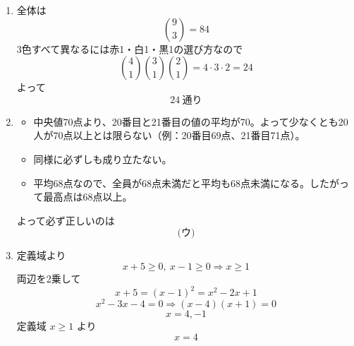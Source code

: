 \documentclass[lualatex,ja=standard]{bxjsarticle}
\begin{document}
\begin{enumerate}
\item 全体は
\[
\binom93=84
\]
3色すべて異なるには赤1・白1・黒1の選び方なので
\[
\binom41\binom31\binom21=4\cdot3\cdot2=24
\]
よって
\[
24\ \text{通り}
\]

\item
\begin{itemize}
\item[(ア)] 中央値70点より、20番目と21番目の値の平均が70。よって少なくとも20人が70点以上とは限らない（例：20番目69点、21番目71点）。
\item[(イ)] 同様に必ずしも成り立たない。
\item[(ウ)] 平均68点なので、全員が68点未満だと平均も68点未満になる。したがって最高点は68点以上。
\end{itemize}
よって必ず正しいのは
\[
\text{(ウ)}
\]

\item 定義域より
\[
x+5\ge0,\ x-1\ge0 \Rightarrow x\ge1
\]
両辺を2乗して
\[
x+5=(x-1)^2=x^2-2x+1
\]
\[
x^2-3x-4=0
\Rightarrow (x-4)(x+1)=0
\]
\[
x=4,-1
\]
定義域 $x\ge1$ より
\[
x=4
\]
\end{enumerate}
\end{document}
